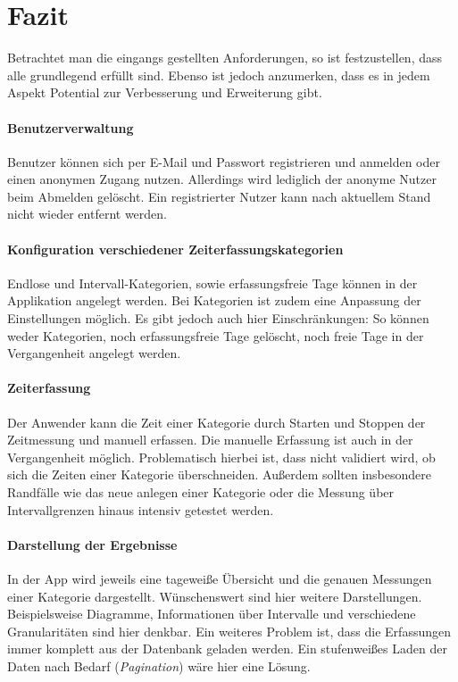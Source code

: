 \section{Fazit}\label{sec:fazit}
Betrachtet man die eingangs gestellten Anforderungen,
so ist festzustellen, dass alle grundlegend erfüllt sind.
Ebenso ist jedoch anzumerken, dass es in jedem Aspekt Potential zur Verbesserung und Erweiterung gibt.

\paragraph{Benutzerverwaltung}
Benutzer können sich per E-Mail und Passwort registrieren und anmelden oder einen anonymen Zugang nutzen.
Allerdings wird lediglich der anonyme Nutzer beim Abmelden gelöscht.
Ein registrierter Nutzer kann nach aktuellem Stand nicht wieder entfernt werden.

\paragraph{Konfiguration verschiedener Zeiterfassungskategorien}
Endlose und Intervall-Kategorien, sowie erfassungsfreie Tage können in der Applikation angelegt werden.
Bei Kategorien ist zudem eine Anpassung der Einstellungen möglich.
Es gibt jedoch auch hier Einschränkungen: So können weder Kategorien, noch erfassungsfreie Tage gelöscht,
noch freie Tage in der Vergangenheit angelegt werden.

\paragraph{Zeiterfassung}
Der Anwender kann die Zeit einer Kategorie durch Starten und Stoppen der Zeitmessung und manuell erfassen.
Die manuelle Erfassung ist auch in der Vergangenheit möglich.
Problematisch hierbei ist, dass nicht validiert wird, ob sich die Zeiten einer Kategorie überschneiden.
Außerdem sollten insbesondere Randfälle wie das neue anlegen einer Kategorie oder die Messung über Intervallgrenzen hinaus intensiv getestet werden.

\paragraph{Darstellung der Ergebnisse}
In der App wird jeweils eine tageweiße Übersicht und die genauen Messungen einer Kategorie dargestellt.
Wünschenswert sind hier weitere Darstellungen.
Beispielsweise Diagramme, Informationen über Intervalle und verschiedene Granularitäten sind hier denkbar.
Ein weiteres Problem ist, dass die Erfassungen immer komplett aus der Datenbank geladen werden.
Ein stufenweißes Laden der Daten nach Bedarf (\emph{Pagination}) wäre hier eine Lösung.


